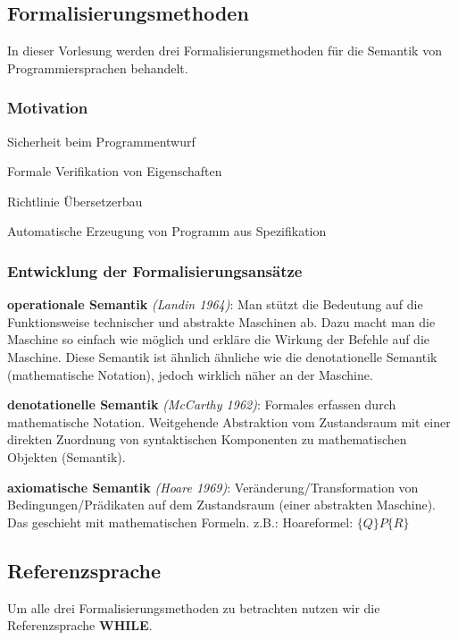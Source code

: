\subsection{Formalisierungsmethoden}
In dieser Vorlesung werden drei Formalisierungsmethoden für die Semantik von Programmiersprachen behandelt.
\subsubsection*{Motivation}
\begin{compactitem}
	\item Sicherheit beim Programmentwurf
	\item Formale Verifikation von Eigenschaften
	\item Richtlinie Übersetzerbau
	\item Automatische Erzeugung von Programm aus Spezifikation
\end{compactitem}

\subsubsection*{Entwicklung der Formalisierungsansätze}
\begin{compactitem}
	\item [\textbf{operationale Semantik}] \emph{(Landin 1964)}:
	Man stützt die Bedeutung auf die Funktionsweise technischer und abstrakte Maschinen ab. Dazu macht man die Maschine so einfach wie möglich und erkläre die Wirkung der Befehle auf die Maschine. Diese Semantik ist ähnlich ähnliche wie die denotationelle Semantik (mathematische Notation), jedoch wirklich näher an der Maschine.
	\item [\textbf{denotationelle Semantik}] \emph{(McCarthy 1962)}:
	Formales erfassen durch mathematische Notation. Weitgehende Abstraktion vom Zustandsraum mit einer direkten Zuordnung von syntaktischen Komponenten zu mathematischen Objekten (Semantik).
	\item [\textbf{axiomatische Semantik}] \emph{(Hoare 1969)}:
	Veränderung/Transformation von Bedingungen/Prädikaten auf dem Zustandsraum (einer abstrakten Maschine).
	Das geschieht mit mathematischen Formeln. z.B.: Hoareformel: $\{Q\}P\{R\}$
\end{compactitem}

\subsection{Referenzsprache}
Um alle drei Formalisierungsmethoden zu betrachten nutzen wir die Referenzsprache \textbf{WHILE}.
